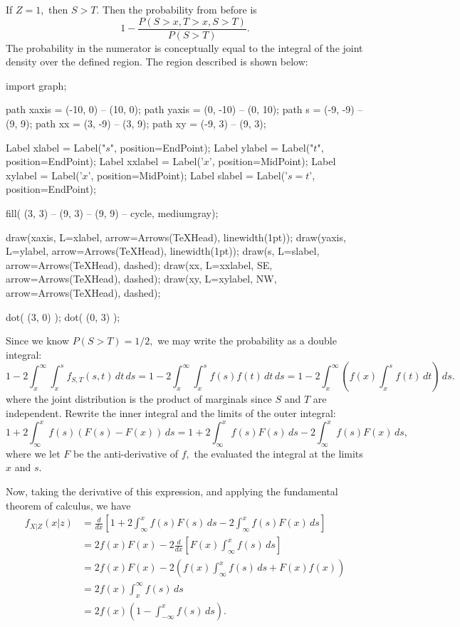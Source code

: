 \documentclass{article}
\begin{document}
\begin{enumerate}
\begin{enumerate}
\begin{enumerate}
\begin{soln}
				If $Z=1,$ then $S>T.$ Then the probability from before is \[1-\frac{P(S>x, T>x, S>T)}{P(S>T)}.\] The probability in the numerator is conceptually equal to the integral of the joint density over the defined region. The region described is shown below:
				\begin{center}
					\begin{asy}
						import graph;

						path xaxis = (-10, 0) -- (10, 0);
						path yaxis = (0, -10) -- (0, 10);
						path s = (-9, -9) -- (9, 9);
						path xx = (3, -9) -- (3, 9);
						path xy = (-9, 3) -- (9, 3);

						Label xlabel = Label("$s$", position=EndPoint);
						Label ylabel = Label("$t$", position=EndPoint);
						Label xxlabel = Label('$x$', position=MidPoint);
						Label xylabel = Label('$x$', position=MidPoint);
						Label slabel = Label('$s=t$', position=EndPoint);

						fill( (3, 3) -- (9, 3) -- (9, 9) -- cycle, mediumgray);

						draw(xaxis, L=xlabel, arrow=Arrows(TeXHead), linewidth(1pt));
						draw(yaxis, L=ylabel, arrow=Arrows(TeXHead), linewidth(1pt));
						draw(s, L=slabel, arrow=Arrows(TeXHead), dashed);
						draw(xx, L=xxlabel, SE, arrow=Arrows(TeXHead), dashed);
						draw(xy, L=xylabel, NW, arrow=Arrows(TeXHead), dashed);

						dot( (3, 0) );
						dot( (0, 3) );
					\end{asy}
				\end{center}

				Since we know $P(S>T)=1/2,$ we may write the probability as a double integral: \[1-2\int_x^\infty \int_x^s f_{S, T}(s, t)\, dt\, ds = 1-2\int_x^\infty \int_x^s f(s) f(t)\, dt\, ds=1-2\int_x^\infty \left( f(x)\int_x^s f(t)\, dt \right)\, ds.\] where the joint distribution is the product of marginals since $S$ and $T$ are independent. Rewrite the inner integral and the limits of the outer integral: \[1+2\int_\infty^x f(s)(F(s)-F(x)) \, ds = 1 + 2\int_\infty^x f(s)F(s)\, ds - 2\int_\infty^x f(s)F(x)\, ds, \] where we let $F$ be the anti-derivative of $f,$ the evaluated the integral at the limits $x$ and $s.$ 

				Now, taking the derivative of this expression, and applying the fundamental theorem of calculus, we have
				\begin{align*}
					f_{X|Z}(x|z) &= \frac{d}{dx}\left[ 1 + 2\int_\infty^x f(s)F(s)\, ds - 2\int_\infty^x f(s)F(x)\, ds \right] \\
					&= 2f(x)F(x) - 2\frac{d}{dx}\left[ F(x)\int_\infty^x f(s)\, ds \right] \\
					&= 2f(x)F(x) - 2\left( f(x)\int_\infty^x f(s)\, ds + F(x)f(x) \right) \\
					&= 2f(x)\int_x^\infty f(s)\, ds \\
					&= 2f(x)\left( 1-\int_{-\infty}^x f(s)\, ds \right).
				\end{align*}


\end{soln}
\end{enumerate}
\end{enumerate}
\end{enumerate}
\end{document}
